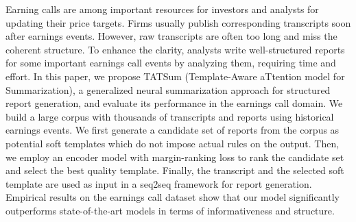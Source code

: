 Earning calls are among important resources for investors and analysts for updating their price targets. Firms usually publish corresponding transcripts soon after earnings events. However, raw transcripts are often too long and miss the coherent structure. To enhance the clarity, analysts write well-structured reports for some important earnings call events by analyzing them, requiring time and effort. In this paper, we propose TATSum (Template-Aware aTtention model for Summarization), a generalized neural summarization approach for structured report generation, and evaluate its performance in the earnings call domain. We build a large corpus with thousands of transcripts and reports using historical earnings events. We first generate a candidate set of reports from the corpus as potential soft templates which do not impose actual rules on the output. Then, we employ an encoder model with margin-ranking loss to rank the candidate set and select the best quality template. Finally, the transcript and the selected soft template are used as input in a seq2seq framework for report generation. Empirical results on the earnings call dataset show that our model significantly outperforms state-of-the-art models in terms of informativeness and structure.

